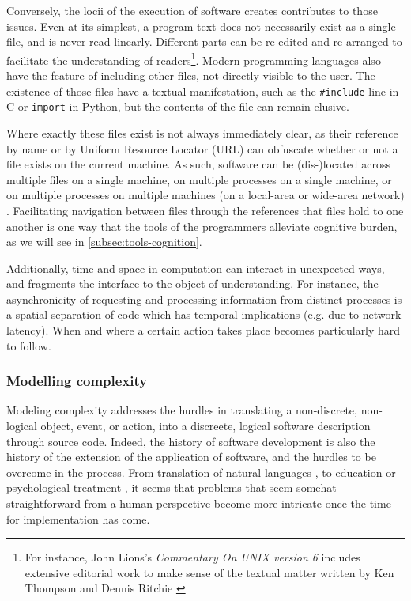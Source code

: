 Conversely, the locii of the execution of software creates contributes to those issues. Even at its simplest, a program text does not necessarily exist as a single file, and is never read linearly. Different parts can be re-edited and re-arranged to facilitate the understanding of readers\footnote{For instance, John Lions's \emph{Commentary On UNIX version 6} includes extensive editorial work to make sense of the textual matter written by Ken Thompson and Dennis Ritchie \citep{lions_lions_1996}}. Modern programming languages also have the feature of including other files, not directly visible to the user. The existence of those files have a textual manifestation, such as the \lstinline{#include} line in C or \lstinline{import} in Python, but the contents of the file can remain elusive.

Where exactly these files exist is not always immediately clear, as their reference by name or by Uniform Resource Locator (URL) can obfuscate whether or not a file exists on the current machine. As such, software can be (dis-)located across multiple files on a single machine, on multiple processes on a single machine, or on multiple processes on multiple machines (on a local-area or wide-area network) \citep{berry_philosophy_2011}. Facilitating navigation between files through the references that files hold to one another is one way that the tools of the programmers alleviate cognitive burden, as we will see in \ref{subsec:tools-cognition}.

Additionally, time and space in computation can interact in unexpected ways, and fragments the interface to the object of understanding. For instance, the asynchronicity of requesting and processing information from distinct processes is a spatial separation of code which has temporal implications (e.g. due to network latency). When and where a certain action takes place becomes particularly hard to follow.

\subsubsection{Modelling complexity}
\label{subsubsec:modelling-complexity}

Modeling complexity addresses the hurdles in translating a non-discrete, non-logical object, event, or action, into a discreete, logical software description through source code. Indeed, the history of software development is also the history of the extension of the application of software, and the hurdles to be overcome in the process. From translation of natural languages \citep{poibeau_machine_2017}, to education \citep{watters_teaching_2021} or psychological treatment \citep{weizenbaum_computer_1976}, it seems that problems that seem somehat straightforward from a human perspective become more intricate once the time for implementation has come.

